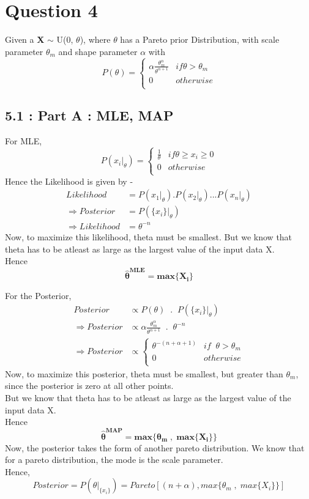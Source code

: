 \documentclass[12pt, a4paper]{article}
\begin{document}
\section*{Question 4}
Given a \textbf{X} $\sim$ U(0, $\theta$), where $\theta$ has a Pareto prior Distribution, with scale parameter $\theta_m$ and shape parameter $\alpha$ with
\[   
P(\theta) = 
     \begin{cases}
       \alpha \frac{\theta^\alpha_m}{\theta^{\alpha + 1}} & if \theta > \theta_m\\
              0 & otherwise\\
     \end{cases}
\]

\subsection*{5.1 : Part A : MLE, MAP}
For MLE,  \\
\[   
P(x_i |_\theta) = 
     \begin{cases}
       \frac{1}{\theta} & if \theta \geq x_i \geq 0\\
              0 & otherwise\\
     \end{cases}
\]
Hence the Likelihood is given by -
\begin{align*}
Likelihood &= P(x_1 |_\theta) . P(x_2 |_\theta) ... P(x_n |_\theta) \\
\Longrightarrow Posterior &= P(\{x_i\} |_\theta) \\
\Longrightarrow Likelihood &= \theta^{-n}
\end{align*}
Now, to maximize this likelihood, theta must be smallest. But we know that theta has to be atleast as large as the largest value of the input data X.\\
Hence
$$
\boxed{\mathbf{\hat{\theta}^{MLE} = max\{X_i\}}}
$$

For the Posterior,
\begin{align*}
Posterior &\propto P(\theta) \;\; . \;\; P(\{x_i\} |_\theta) \\
\Longrightarrow Posterior &\propto \alpha \frac{\theta^\alpha_m}{\theta^{\alpha + 1}} \;\; . \;\; \theta^{-n} \\
\Longrightarrow Posterior &\propto 
     \begin{cases}
       \theta^{-(n+\alpha + 1)} & if \;\; \theta > \theta_m \\
              0 & otherwise\\
     \end{cases}
\end{align*}
Now, to maximize this posterior, theta must be smallest, but greater than $\theta_m$, since the posterior is zero at all other points. \\ But we know that theta has to be atleast as large as the largest value of the input data X.\\
Hence
$$
\boxed{\mathbf{\hat{\theta}^{MAP} = max\{\theta_m \; , \; max\{X_i\}\}}}
$$
Now, the posterior takes the form of another pareto distribution. We know that for a pareto distribution, the mode is the scale parameter. \\
Hence,
$$
Posterior = P(\theta|_{\{x_i\}}) = Pareto[(n+\alpha), max\{\theta_m \; , \; max\{X_i\}\}]
$$
\end{document}
